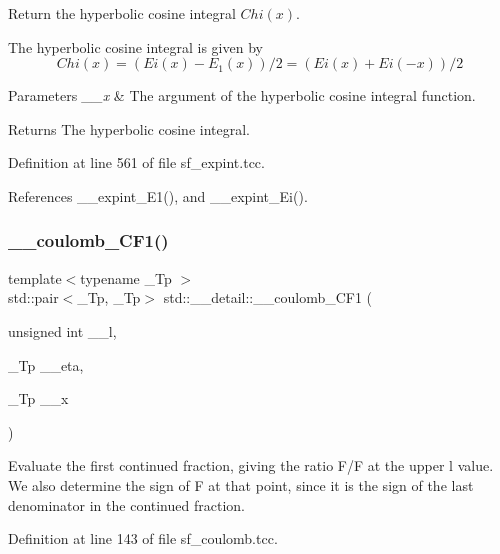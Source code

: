 Return the hyperbolic cosine integral $ Chi(x) $. 

The hyperbolic cosine integral is given by \[ Chi(x) = (Ei(x) - E_1(x))/ 2 = (Ei(x) + Ei(-x))/2 \]


\begin{DoxyParams}{Parameters}
{\em \+\_\+\+\_\+x} & The argument of the hyperbolic cosine integral function. \\
\hline
\end{DoxyParams}
\begin{DoxyReturn}{Returns}
The hyperbolic cosine integral. 
\end{DoxyReturn}


Definition at line 561 of file sf\+\_\+expint.\+tcc.



References \+\_\+\+\_\+expint\+\_\+\+E1(), and \+\_\+\+\_\+expint\+\_\+\+Ei().

\mbox{\label{namespacestd_1_1____detail_a0737f268d024ed5d66d3e926239a5c49}} 
\subsubsection{\texorpdfstring{\+\_\+\+\_\+coulomb\+\_\+\+C\+F1()}{\_\_coulomb\_CF1()}}
{\footnotesize\ttfamily template$<$typename \+\_\+\+Tp $>$ \\
std\+::pair$<$\+\_\+\+Tp, \+\_\+\+Tp$>$ std\+::\+\_\+\+\_\+detail\+::\+\_\+\+\_\+coulomb\+\_\+\+C\+F1 (\begin{DoxyParamCaption}\item[{unsigned int}]{\+\_\+\+\_\+l,  }\item[{\+\_\+\+Tp}]{\+\_\+\+\_\+eta,  }\item[{\+\_\+\+Tp}]{\+\_\+\+\_\+x }\end{DoxyParamCaption})}

Evaluate the first continued fraction, giving the ratio F\textquotesingle{}/F at the upper l value. We also determine the sign of F at that point, since it is the sign of the last denominator in the continued fraction. 

Definition at line 143 of file sf\+\_\+coulomb.\+tcc.

\mbox{\label{namespacestd_1_1____detail_a400332397b6d529764b61bdd7726f75c}} 
